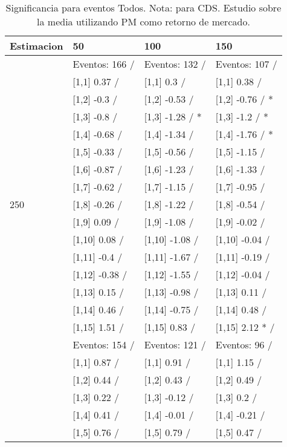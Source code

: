 \begin{table}

\caption{Significancia para eventos Todos. Nota: para CDS. Estudio sobre la media utilizando PM como retorno de mercado.}
\centering
\begin{tabular}[t]{llll}
\toprule
Estimacion & 50 & 100 & 150\\
\midrule
 & Eventos:  166 / & Eventos:  132 / & Eventos:  107 /\\
 & {}[1,1] 0.37  / & {}[1,1] 0.3  / & {}[1,1] 0.38  /\\
 & {}[1,2] -0.3  / & {}[1,2] -0.53  / & {}[1,2] -0.76  / *\\
 & {}[1,3] -0.8  / & {}[1,3] -1.28  / * & {}[1,3] -1.2  / *\\
 & {}[1,4] -0.68  / & {}[1,4] -1.34  / & {}[1,4] -1.76  / *\\
\addlinespace
 & {}[1,5] -0.33  / & {}[1,5] -0.56  / & {}[1,5] -1.15  /\\
 & {}[1,6] -0.87  / & {}[1,6] -1.23  / & {}[1,6] -1.33  /\\
 & {}[1,7] -0.62  / & {}[1,7] -1.15  / & {}[1,7] -0.95  /\\
250 & {}[1,8] -0.26  / & {}[1,8] -1.22  / & {}[1,8] -0.54  /\\
 & {}[1,9] 0.09  / & {}[1,9] -1.08  / & {}[1,9] -0.02  /\\
\addlinespace
 & {}[1,10] 0.08  / & {}[1,10] -1.08  / & {}[1,10] -0.04  /\\
 & {}[1,11] -0.4  / & {}[1,11] -1.67  / & {}[1,11] -0.19  /\\
 & {}[1,12] -0.38  / & {}[1,12] -1.55  / & {}[1,12] -0.04  /\\
 & {}[1,13] 0.15  / & {}[1,13] -0.98  / & {}[1,13] 0.11  /\\
 & {}[1,14] 0.46  / & {}[1,14] -0.75  / & {}[1,14] 0.48  /\\
\addlinespace
 & {}[1,15] 1.51  / & {}[1,15] 0.83  / & {}[1,15] 2.12 * /\\
 & Eventos:  154 / & Eventos:  121 / & Eventos:  96 /\\
 & {}[1,1] 0.87  / & {}[1,1] 0.91  / & {}[1,1] 1.15  /\\
 & {}[1,2] 0.44  / & {}[1,2] 0.43  / & {}[1,2] 0.49  /\\
 & {}[1,3] 0.22  / & {}[1,3] -0.12  / & {}[1,3] 0.2  /\\
\addlinespace
 & {}[1,4] 0.41  / & {}[1,4] -0.01  / & {}[1,4] -0.21  /\\
 & {}[1,5] 0.76  / & {}[1,5] 0.79  / & {}[1,5] 0.47  /\\

\end{tabular}
\end{table}
